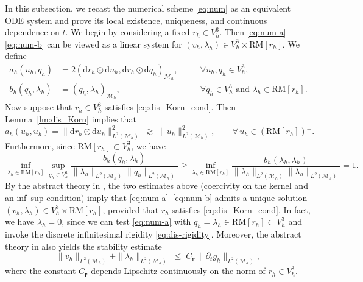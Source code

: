 \documentclass[11pt,a4paper,oneside,reqno]{amsart}
\theoremstyle{definition}
\theoremstyle{plain}
\numberwithin{theorem}{section}
\numberwithin{proposition}{section}
\numberwithin{lemma}{section}
\numberwithin{equation}{section}
\newcommand{\Man}{\mathcal{M}}
\newcommand{\RM}{\mathrm{RM}}
\begin{document}
In this subsection, we recast the numerical scheme \eqref{eq:num} as an equivalent ODE system and prove its
local existence, uniqueness, and continuous dependence on \(t\).
We begin by considering a fixed \(r_h \in V_h^3\). Then \eqref{eq:num-a}--\eqref{eq:num-b} can be viewed as a linear system for
\((v_h,\lambda_h)\in V_h^3\times \RM[r_h]\).
We define
\begin{align*}
a_h(u_h, q_h) &= 2(\mathrm{d}r_h \odot \mathrm{d}u_h, \mathrm{d}r_h \odot \mathrm{d}q_h)_{\Man_h},
\quad && \forall u_h, q_h \in V_h^3,
\\
b_h(q_h, \lambda_h) &= (q_h,\lambda_h)_{\Man_h}, \quad && \forall q_h \in V_h^3
\text{ and } \lambda_h \in \RM[r_h].
\end{align*}
Now suppose that \(r_h\in V_h^3\) satisfies \eqref{eq:dis_Korn_cond}. Then Lemma~\ref{lm:dis_Korn} implies that
\[
a_h(u_h,u_h)=\|\mathrm{d} r_h \odot \mathrm{d} u_h\|_{L^2(\Man_h)}^{2}\;\gtrsim\;\|u_h\|_{L^2(\Man_h)}^{2},
\qquad \forall\,u_h\in(\RM[r_h])^{\perp}.
\]
Furthermore, since \(\RM[r_h] \subset V_h^3 \), we have
\[
    \inf_{\lambda_h \in \RM[r_h]}
    \sup_{q_h \in V_h^3}
    \frac{
        b_h(q_h, \lambda_h)
    }{
        \|\lambda_h\|_{L^2(\Man_h)}
        \|q_h\|_{L^2(\Man_h)}
    } \geq
    \inf_{\lambda_h \in \RM[r_h]}
    \frac{
        b_h(\lambda_h, \lambda_h)
    }{
        \|\lambda_h\|_{L^2(\Man_h)}
        \|\lambda_h\|_{L^2(\Man_h)}}
    = 1.
\]
By the abstract  theory in \cite{boffi2013mixed}, the two estimates above (coercivity on the kernel and an inf--sup condition)
imply that \eqref{eq:num-a}--\eqref{eq:num-b} admits a unique solution \((v_h,\lambda_h)\in V_h^3\times \RM[r_h]\),
provided that \(r_h\) satisfies \eqref{eq:dis_Korn_cond}. 
In fact, we have \(\lambda_h=0\), since we can test \eqref{eq:num-a} with \(q_h=\lambda_h\in \RM[r_h]\subset V_h^3\) and invoke the discrete infinitesimal rigidity \eqref{eq:dis-rigidity}. 
Moreover, the abstract theory in \cite{boffi2013mixed} also yields the stability estimate
\[
\| v_h \|_{L^2(\Man_h)} + \|\lambda_h\|_{L^2(\Man_h)} \;\le\; C_{\mathbf r}\,\|\partial_t g_h\|_{L^2(\Man_h)},
\]
where the constant \(C_{\mathbf r}\) depends Lipschitz continuously on the norm of \(r_h\in V_h^3\).
\end{document}
